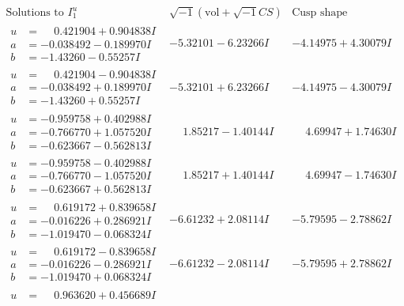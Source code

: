 \documentclass[1p]{elsarticle_modified}
\theoremstyle{definition}
\newcommand{\I}{\sqrt{-1}}
\begin{document}
$$\begin{array}{c|c|c}  
\text{Solutions to }I^u_{1}& \I (\text{vol} + \sqrt{-1}CS) & \text{Cusp shape}\\
 \hline 
\begin{aligned}
u &= \phantom{-}0.421904 + 0.904838 I \\
a &= -0.038492 - 0.189970 I \\
b &= -1.43260 - 0.55257 I\end{aligned}
 & -5.32101 - 6.23266 I & -4.14975 + 4.30079 I \\ \hline\begin{aligned}
u &= \phantom{-}0.421904 - 0.904838 I \\
a &= -0.038492 + 0.189970 I \\
b &= -1.43260 + 0.55257 I\end{aligned}
 & -5.32101 + 6.23266 I & -4.14975 - 4.30079 I \\ \hline\begin{aligned}
u &= -0.959758 + 0.402988 I \\
a &= -0.766770 + 1.057520 I \\
b &= -0.623667 - 0.562813 I\end{aligned}
 & \phantom{-}1.85217 - 1.40144 I & \phantom{-}4.69947 + 1.74630 I \\ \hline\begin{aligned}
u &= -0.959758 - 0.402988 I \\
a &= -0.766770 - 1.057520 I \\
b &= -0.623667 + 0.562813 I\end{aligned}
 & \phantom{-}1.85217 + 1.40144 I & \phantom{-}4.69947 - 1.74630 I \\ \hline\begin{aligned}
u &= \phantom{-}0.619172 + 0.839658 I \\
a &= -0.016226 + 0.286921 I \\
b &= -1.019470 - 0.068324 I\end{aligned}
 & -6.61232 + 2.08114 I & -5.79595 - 2.78862 I \\ \hline\begin{aligned}
u &= \phantom{-}0.619172 - 0.839658 I \\
a &= -0.016226 - 0.286921 I \\
b &= -1.019470 + 0.068324 I\end{aligned}
 & -6.61232 - 2.08114 I & -5.79595 + 2.78862 I \\ \hline\begin{aligned}
u &= \phantom{-}0.963620 + 0.456689 I \\

\end{aligned}
\end{array}$$
\end{document}
